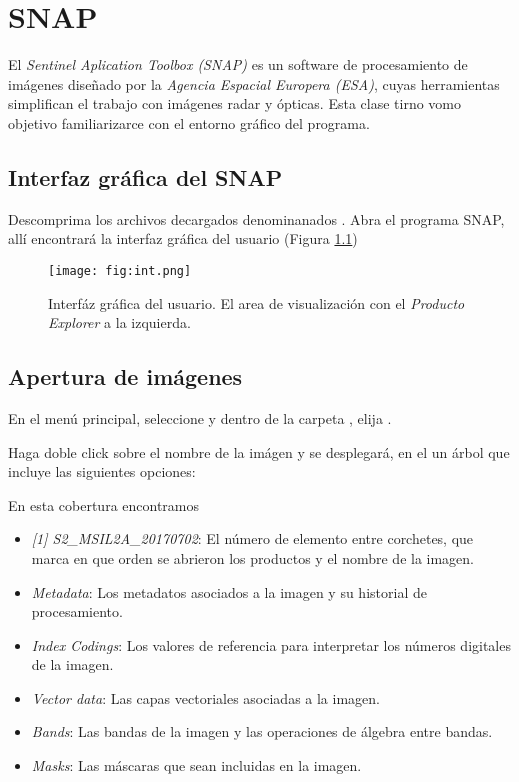 \chapter{SNAP}

El \emph{Sentinel Aplication Toolbox (SNAP)} es un  software de procesamiento de imágenes diseñado por la \emph{Agencia Espacial Europera (ESA)}, cuyas herramientas simplifican el trabajo con imágenes radar y ópticas.
Esta clase tirno vomo objetivo familiarizarce con el entorno gráfico del programa.

\section{Interfaz gráfica del SNAP}

Descomprima los archivos decargados denominanados . Abra el programa SNAP, allí encontrará la interfaz gráfica del usuario (Figura \ref{fig:int})

\begin{figure}[h!]
    \centering
    \texttt{[image: fig:int.png]}
    \caption{Interfáz gráfica del usuario. El area de visualización con el \emph{Producto Explorer} a la izquierda.}
    \label{fig:int}
\end{figure}

\section{Apertura de imágenes}

En el menú principal, seleccione  y dentro de la carpeta , elija .

Haga doble click sobre el nombre de la imágen y se desplegará, en el  un árbol que incluye las siguientes opciones:

En esta cobertura encontramos

\begin{itemize}
    \item \emph{[1] S2\_MSIL2A\_20170702}: El número de elemento entre corchetes, que marca en que orden se abrieron los productos y el nombre de la imagen.
    \item \emph{Metadata}: Los metadatos asociados a la imagen y su historial de procesamiento.
    \item \emph{Index Codings}: Los valores de referencia para interpretar los números digitales de la imagen.
    \item \emph{Vector data}: Las capas vectoriales asociadas a la imagen.
    \item \emph{Bands}: Las bandas de la imagen y las operaciones de álgebra entre bandas.
    \item \emph{Masks}: Las máscaras que sean incluidas en la imagen.
\end{itemize}


